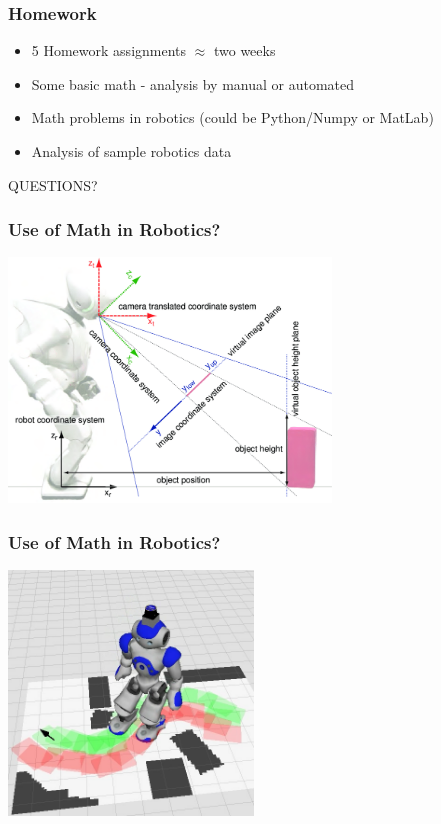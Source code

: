 \documentclass[10pt]{beamer}
\begin{document}
\begin{frame}
  \frametitle{Homework}
  \begin{itemize}
  \item 5 Homework assignments $\approx$ two weeks
  \item Some basic math - analysis by manual or automated
  \item Math problems in robotics (could be Python/Numpy or MatLab)
  \item Analysis of sample robotics data
  \end{itemize}
\end{frame}

\begin{frame}
  \centerline{\Huge QUESTIONS?}
\end{frame}


\begin{frame}
  \frametitle{Use of Math in Robotics? }
  \centerline{\includegraphics[height=6.5cm]{Computation-of-object-positions-on-the-ground-plane-size-estimation-and-the-involved.png}}
\end{frame}

\begin{frame}
  \frametitle{Use of Math in Robotics? }
  \centerline{\includegraphics[height=6.5cm]{plan_intro}}
\end{frame}
  
\end{document}
